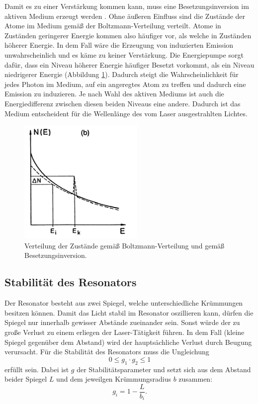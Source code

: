 Damit es zu einer Verstärkung kommen kann, muss eine Besetzungsinversion im aktiven Medium erzeugt werden . Ohne äußeren Einfluss sind die Zustände der Atome im Medium gemäß der Boltzmann-Verteilung verteilt. Atome in Zuständen geringerer Energie kommen also häufiger vor, als welche in Zuständen höherer Energie. In dem Fall wäre die Erzeugung von induzierten Emission unwahrscheinlich und es käme zu keiner Verstärkung.
Die Energiepumpe sorgt dafür, dass ein Niveau höherer Energie häufiger Besetzt vorkommt, als ein Niveau niedrigerer Energie (Abbildung \ref{fig:inv}). Dadurch steigt die Wahrscheinlichkeit für jedes Photon im Medium, auf ein angeregtes Atom zu treffen und dadurch eine Emission zu induzieren. Je nach Wahl des aktiven Mediums ist auch die Energiedifferenz zwischen diesen beiden Niveaus eine andere. Dadurch ist das Medium entscheident für die Wellenlänge des vom Laser ausgestrahlten Lichtes.

\begin{figure}
    \centering
    \includegraphics[width=6cm]{Bilder/Inversion.PNG}
    \caption{Verteilung der Zustände gemäß Boltzmann-Verteilung und gemäß Besetzungsinversion.\cite{Laserspektroskopie_1}}
    \label{fig:inv}
\end{figure}

\subsection{Stabilität des Resonators}
Der Resonator besteht aus zwei Spiegel, welche unterschiedliche Krümmungen besitzen können. Damit das Licht stabil im Resonator oszillieren kann, dürfen die Spiegel nur innerhalb gewisser Abstände zueinander sein. Sonst würde der zu große Verlust zu einem erliegen der Laser-Tätigkeit führen. In dem Fall (kleine Spiegel gegenüber dem Abstand) wird der hauptsächliche Verlust durch Beugung verursacht.
Für die Stabilität des Resonators muss die Ungleichung
\begin{equation}
    \label{eqn:g}
   0 \leq g_1 \cdot g_2 \leq 1
\end{equation}
erfüllt sein. Dabei ist $g$ der Stabilitätsparameter und setzt sich aus dem Abstand beider Spiegel $L$ und dem jeweilgen Krümmungsradius $b$ zusammen:
\begin{equation}
    g_i = 1-\frac{L}{b_i}.
\end{equation}

